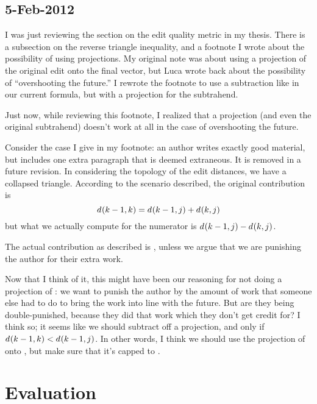 \subsection{5-Feb-2012}

I was just reviewing the section on the edit quality metric in my thesis.
There is a subsection on the reverse triangle inequality, and a footnote
I wrote about the possibility of using projections.
My original note was about using a projection of the original edit onto
the final vector, but Luca wrote back about the possibility of
``overshooting the future.''
I rewrote the footnote to use a subtraction like in our current formula,
but with a projection for the subtrahend.

Just now, while reviewing this footnote, I realized that a projection
(and even the original subtrahend) doesn't work at all in the case of
overshooting the future.

Consider the case I give in my footnote: an author writes exactly good
material, but includes one extra paragraph that is deemed extraneous.
It is removed in a future revision.
In considering the topology of the edit distances, we have a collapsed
triangle.
According to the scenario described, the original contribution is
\begin{equation}
d_{}(k-1,k) = d_{}(k-1,j) + d_{}(k,j)
\end{equation}
but what we actually compute for the numerator is
$d_{}(k-1,j) - d_{}(k,j)$.

The actual contribution as described is ,
unless we argue that we are punishing the author for their extra work.

Now that I think of it, this might have been our reasoning for not doing a
projection of : we want to punish the author by the amount
of work that someone else had to do to bring the work into line with the
future.
But are they being double-punished, because they did that work which
they don't get credit for?
I think so; it seems like we should subtract off a projection, and only
if $d_{}(k-1,k) < d_{}(k-1,j)$.
In other words, I think we should use the projection of 
onto , but make sure that it's capped to .

\section{Evaluation}

